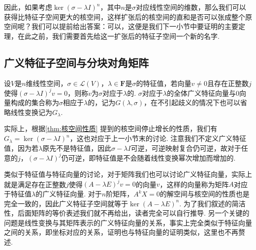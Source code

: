 因此，如果考虑$\ker(\sigma-\lambda I)^n$，其中$n$是$\sigma$对应线性空间的维数，那么我们可以获得比特征子空间更大的核空间，这样扩张后的核空间的直和是否可以张成整个原空间呢？我们可以提前给出答案：可以，这便是我们下一小节中要证明的主要定理，在此之前，我们需要首先给这一扩张后的特征子空间一个新的名字.

\subsection{广义特征子空间与分块对角矩阵}

\begin{definition}{}{}
    设$V$是$n$维线性空间，$\sigma\in \mathcal{L}(V)$，$\lambda\in\mathbf{F}$是$\sigma$的特征值，若向量$v\neq 0$且存在正整数$j$使得$(\sigma-\lambda I)^jv=0$，则称$v$为$\sigma$对应于$\lambda$的. $\sigma$对应于$\lambda$的全体广义特征向量与0向量构成的集合称为$\sigma$相应于$\lambda$的，记为$G(\lambda,\sigma)$，在不引起歧义的情况下也可以省略线性变换记为$G_\lambda$.
\end{definition}

实际上，根据\autoref{thm:核空间性质} 提到的核空间停止增长的性质，我们有$G_\lambda=\ker (\sigma-\lambda I)^n$，这也对应于上一小节末的讨论. 注意我们不定义广义特征值，因为若$\lambda$原先不是特征值，因此$\sigma-\lambda I$可逆，可逆映射复合仍可逆，故对于任意的$j$，$(\sigma-\lambda I)^j$仍可逆，即特征值是不会随着线性变换幂次增加而增加的.

类似于特征值与特征向量的讨论，对于矩阵我们也可以讨论广义特征向量，实际上就是满足存在正整数$j$使得$(A-\lambda E)^jv=0$的向量$v$，这样的向量称为矩阵$A$对应于特征值$\lambda$的广义特征向量. 对于$n$阶矩阵，$A^kX=0$的解空间与核空间的性质也是完全一致的，因此广义特征子空间就等于$\ker(A-\lambda E)^n$. 为了我们叙述的简洁性，后面矩阵的等价表述我们就不再给出，读者完全可以自行推导. 另一个关键的问题是线性变换与其矩阵表示的广义特征向量的关系，事实上完全类似于特征向量之间的关系，即坐标对应的关系，证明也与特征向量的证明类似，这里也不再赘述.

